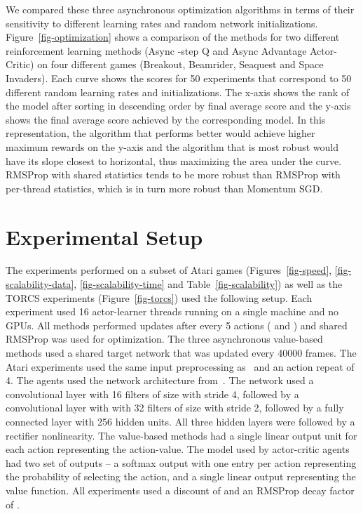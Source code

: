 \documentclass{article} \usepackage{times}
\begin{document}
We compared these three asynchronous optimization algorithms in terms of their sensitivity to different learning rates and random network initializations.
Figure~\ref{fig-optimization} shows a comparison of the methods for two different reinforcement learning methods (Async -step Q and Async Advantage Actor-Critic) on four different games (Breakout, Beamrider, Seaquest and Space Invaders).
Each curve shows the scores for 50 experiments that correspond to 50 different random learning rates and initializations.
The x-axis shows the rank of the model after sorting in descending order by final average score and the y-axis shows the final average score achieved by the corresponding model.
In this representation, the algorithm that performs better would achieve higher maximum rewards on the y-axis and the algorithm that is most robust would have its slope closest to horizontal, thus maximizing the area under the curve.
RMSProp with shared statistics tends to be more robust than RMSProp with per-thread statistics, which is in turn more robust than Momentum SGD.

\section{Experimental Setup}
\label{sec:experimental-setup}
The experiments performed on a subset of Atari games (Figures~\ref{fig-speed}, \ref{fig-scalability-data}, \ref{fig-scalability-time} and Table~\ref{fig-scalability}) as well as the TORCS experiments (Figure~\ref{fig-torcs}) used the following setup.  Each experiment used 16 actor-learner threads running on a single machine and no GPUs.
All methods performed updates after every 5 actions ( and ) and shared RMSProp was used for optimization.
The three asynchronous value-based methods used a shared target network that was updated every 40000 frames.
The Atari experiments used the same input preprocessing as~\cite{mnih-dqn-2015} and an action repeat of 4.
The agents used the network architecture from~\cite{mnih-atari-2013}.
The network used a convolutional layer with 16 filters of size  with stride 4, followed by a convolutional layer with with 32 filters of size  with stride 2, followed by a fully connected layer with 256 hidden units.
All three hidden layers were followed by a rectifier nonlinearity.
The value-based methods had a single linear output unit for each action representing the action-value.
The model used by actor-critic agents had two set of outputs -- a softmax output with one entry per action representing the probability of selecting the action, and a single linear output representing the value function.
All experiments used a discount of  and an RMSProp decay factor of .
\end{document}
